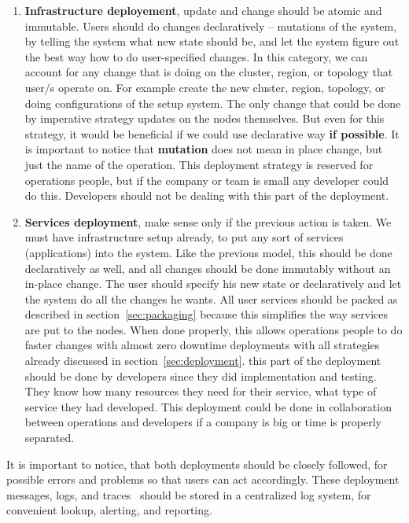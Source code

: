 \begin{enumerate}[start=1,label={(\bfseries \arabic*)}]
	\item \textbf{Infrastructure deployement}, update and change should be atomic and immutable. Users should do changes declaratively -- mutations of the system, by telling the system what new state should be, and let the system figure out the best way how to do user-specified changes. In this category, we can account for any change that is doing on the cluster, region, or topology that user/s operate on. For example create the new cluster, region, topology, or doing configurations of the setup system. The only change that could be done by imperative strategy updates on the nodes themselves. But even for this strategy, it would be beneficial if we could use declarative way \textbf{if possible}. It is important to notice that \textbf{mutation} does not mean in place change, but just the name of the operation. This deployment strategy is reserved for operations people, but if the company or team is small any developer could do this. Developers should not be dealing with this part of the deployment.
	\item \textbf{Services deployment}, make sense only if the previous action is taken. We must have infrastructure setup already, to put any sort of services (applications) into the system. Like the previous model, this should be done declaratively as well, and all changes should be done immutably without an in-place change. The user should specify his new state or  declaratively and let the system do all the changes he wants. All user services should be packed as described in section~\ref{sec:packaging} because this simplifies the way services are put to the nodes. When done properly, this allows operations people to do faster changes with almost zero downtime deployments with all strategies already discussed in section~\ref{sec:deployment}. this part of the deployment should be done by developers since they did implementation and testing. They know how many resources they need for their service, what type of service they had developed. This deployment could be done in collaboration between operations and developers if a company is big or time is properly separated.
\end{enumerate}

\noindent
It is important to notice, that both deployments should be closely followed, for possible errors and problems so that users can act accordingly. These deployment messages, logs, and traces~\cite{36356} should be stored in a centralized log system, for convenient lookup, alerting, and reporting.

